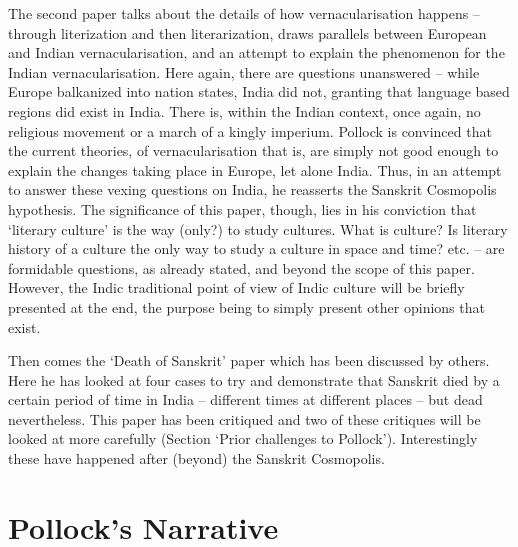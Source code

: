 The second paper talks about the details of how vernacularisation happens – through literization and then literarization, draws parallels between European and Indian vernacularisation, and an attempt to explain the phenomenon for the Indian vernacularisation. Here again, there are questions unanswered – while Europe balkanized into nation states, India did not, granting that language based regions did exist in India. There is, within the Indian context, once again, no religious movement or a march of a kingly imperium. Pollock is convinced that the current theories, of vernacularisation that is, are simply not good enough to explain the changes taking place in Europe, let alone India. Thus, in an attempt to answer these vexing questions on India, he reasserts the Sanskrit Cosmopolis hypothesis. The significance of this paper, though, lies in his conviction that ‘literary culture’ is the way (only?) to study cultures. What is culture? Is literary history of a culture the only way to study a culture in space and time? etc. – are formidable questions, as already stated, and beyond the scope of this paper. However, the Indic traditional point of view of Indic culture will be briefly presented at the end, the purpose being to simply present other opinions that exist.

Then comes the ‘Death of Sanskrit’ paper which has been discussed by others. Here he has looked at four cases to try and demonstrate that Sanskrit died by a certain period of time in India – different times at different places – but dead nevertheless. This paper has been critiqued and two of these critiques will be looked at more carefully (Section ‘Prior challenges to Pollock’). Interestingly these have happened after (beyond) the Sanskrit Cosmopolis.



\section*{Pollock’s Narrative}

